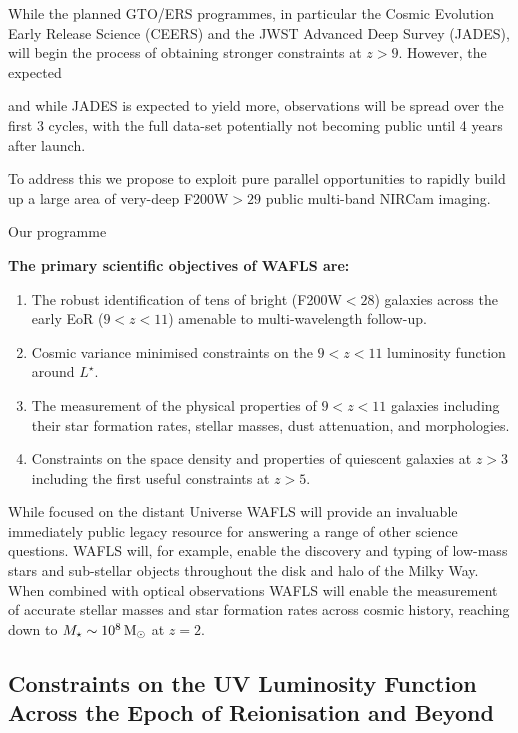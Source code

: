 \documentclass[12pt]{article}
\begin{document}
While the planned GTO/ERS programmes, in particular the Cosmic Evolution Early Release Science (CEERS) and the JWST Advanced Deep Survey (JADES), will begin the process of obtaining stronger constraints at $z>9$. However, the expected 

and while JADES is expected to yield more, observations will be spread over the first 3 cycles, with the full data-set potentially not becoming public until 4 years after launch. 

To address this we propose to exploit pure parallel opportunities to rapidly build up a large area of very-deep F200W$>29$ public multi-band NIRCam imaging. 

Our programme



\noindent
\textbf{The primary scientific objectives of WAFLS are:}
\vspace{-1mm}
\begin{enumerate}
\item The robust identification of tens of bright (F200W$<28$) galaxies across the early EoR ($9<z<11$) amenable to multi-wavelength follow-up.
\item Cosmic variance minimised constraints on the $9<z<11$ luminosity function around $L^{\star}$.
\item The measurement of the physical properties of $9<z<11$ galaxies including their star formation rates, stellar masses, dust attenuation, and morphologies. 
\item Constraints on the space density and properties of quiescent galaxies at $z>3$ including the first useful constraints at $z>5$.
\end{enumerate}

While focused on the distant Universe WAFLS will provide an invaluable immediately public legacy resource for answering a range of other science questions. WAFLS will, for example, enable the discovery and typing of low-mass stars and sub-stellar objects throughout the disk and halo of the Milky Way. When combined with optical observations WAFLS will enable the measurement of accurate stellar masses and star formation rates across cosmic history, reaching down to $M_{\star}\sim 10^{8}\,{\rm M_{\odot}}$ at $z=2$.


\subsection*{Constraints on the UV Luminosity Function Across the Epoch of Reionisation and Beyond}\label{sec:UVLF}
\end{document}
